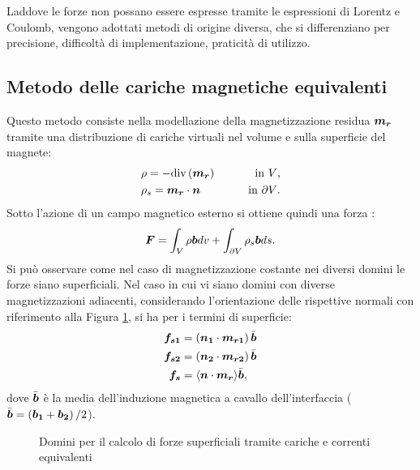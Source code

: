 Laddove le forze non possano essere espresse tramite le espressioni di Lorentz e Coulomb, vengono adottati metodi di origine diversa, che si differenziano per precisione, difficoltà di implementazione, praticità di utilizzo.
\subsection{Metodo delle cariche magnetiche equivalenti}
 Questo metodo consiste nella modellazione della magnetizzazione residua $\boldsymbol{m_r}$ tramite una distribuzione di cariche virtuali nel volume e sulla superficie del magnete:
\begin{align}
\label{eq:5cariche_eq1a}
&\rho =-\text{div} \left(\boldsymbol{m_r}\right) \qquad  &\text{in $V$,}\\
\label{eq:5cariche_eq1b}
&\rho_s =\boldsymbol{m_r}\cdot \boldsymbol{n} \qquad &\text{in $\partial V$.}
\end{align}
Sotto l'azione di un campo magnetico esterno si ottiene quindi una forza \citep{furlani_permanent_2001}:
\begin{equation}
\label{eq:5sourcef}
\boldsymbol{F} = \int_V \rho\boldsymbol{b} dv+\int_{\partial V} \rho_s \boldsymbol{b} ds. 
\end{equation}
Si può osservare come nel caso di magnetizzazione costante nei diversi domini le forze siano superficiali.
Nel caso in cui vi siano domini con diverse magnetizzazioni adiacenti, considerando l'orientazione delle rispettive normali con riferimento alla Figura \ref{fig:5.1}, si ha per i termini di superficie:
\begin{align}
\label{eq:5sourcef2}
\boldsymbol{f_{s1}}&=\left(\boldsymbol{n_1}\cdot\boldsymbol{m_{r1}}\right)\bar{\boldsymbol{b}}\nonumber\\
\boldsymbol{f_{s2}}&=\left(\boldsymbol{n_2}\cdot\boldsymbol{m_{r2}}\right)\bar{\boldsymbol{b}}\nonumber\\
\boldsymbol{f_{s}}&=\langle\boldsymbol{n}\cdot\boldsymbol{m_{r}}\rangle\bar{\boldsymbol{b}},
\end{align}
dove $\bar{\boldsymbol{b}}$ è la media dell'induzione magnetica a cavallo dell'interfaccia ($\bar{\boldsymbol{b}}=\left(\boldsymbol{b_1}+\boldsymbol{b_2}\right)/2$).
\begin{figure}
\caption{Domini per il calcolo di forze superficiali tramite cariche e correnti equivalenti}
\label{fig:5.1}
\end{figure}
